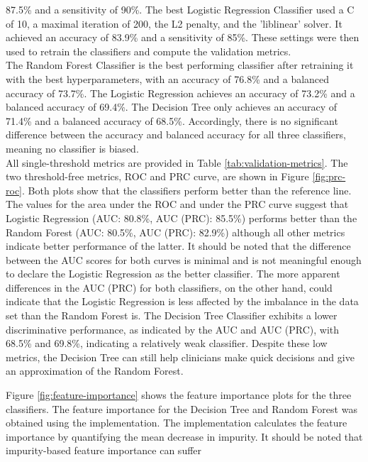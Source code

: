 87.5\% and a 
sensitivity of 90\%. The best Logistic Regression Classifier used a C of 10, a 
maximal iteration of 200, the L2 penalty, and the 'liblinear' solver. It 
achieved an accuracy 
of 83.9\% and a sensitivity of 85\%. These settings were then used to retrain 
the classifiers and compute the validation metrics.
\\
The Random Forest Classifier is the best performing classifier after 
retraining it with the best hyperparameters, with an accuracy of 76.8\% and a 
balanced accuracy of 73.7\%. The Logistic Regression achieves an accuracy of 
73.2\% and a balanced accuracy of 69.4\%. The Decision Tree only 
achieves an accuracy of 71.4\% and a balanced accuracy of 68.5\%. 
Accordingly, there is no significant difference between the accuracy and 
balanced accuracy for all three classifiers, meaning no classifier is biased.
\\
All single-threshold metrics are provided in Table \ref{tab:validation-metrics}.
The two threshold-free metrics, ROC and PRC curve, are shown in Figure 
\ref{fig:prc-roc}. Both plots show that the classifiers perform better than the 
reference line. The values for the area under the ROC and under the PRC curve 
suggest that Logistic Regression (AUC: 80.8\%, AUC (PRC): 85.5\%) performs 
better than the Random Forest (AUC: 80.5\%, AUC (PRC): 82.9\%) although all 
other metrics indicate better performance of the latter. It 
should be noted that the difference between the AUC scores for both curves is 
minimal and is not meaningful enough to declare the Logistic Regression as the 
better classifier. The more apparent differences in the AUC (PRC) for both 
classifiers, on the other hand, could indicate that the Logistic Regression is 
less affected by the imbalance in the data set than the Random Forest is.
The Decision Tree Classifier exhibits a lower discriminative performance,
as indicated by the AUC and AUC (PRC), with 68.5\% and 69.8\%, 
indicating a relatively weak classifier. Despite these low metrics, the 
Decision Tree can still help clinicians make quick decisions and give an 
approximation of the Random Forest.
\par
Figure \ref{fig:feature-importance} shows the feature importance plots for the 
three classifiers. The feature importance for the Decision Tree and Random 
Forest was obtained using the  implementation. The implementation 
calculates 
the feature importance by quantifying the mean decrease in impurity. 
It should be noted that impurity-based feature importance can suffer 
